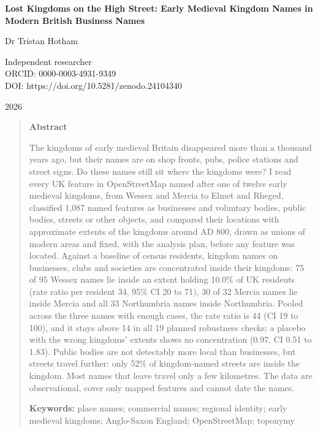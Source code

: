\documentclass[11pt,a4paper]{article}
\begin{document}
\begin{center}
{\Large\bfseries Lost Kingdoms on the High Street: Early Medieval Kingdom Names in Modern British Business Names\par}
\vspace{1.2em}
{\large Dr Tristan Hotham\par}
\vspace{0.3em}
{\small Independent researcher\\
ORCID: 0000-0003-4931-9349\\
DOI: https://doi.org/10.5281/zenodo.24104340\par}
\vspace{0.8em}
2026
\end{center}

\begin{quote}
\small
\begin{center}\textbf{Abstract}\end{center}
The kingdoms of early medieval Britain disappeared more than a thousand years ago, but their names are on shop fronts, pubs, police stations and street signs. Do these names still sit where the kingdoms were? I read every UK feature in OpenStreetMap named after one of twelve early medieval kingdoms, from Wessex and Mercia to Elmet and Rheged, classified 1,087 named features as businesses and voluntary bodies, public bodies, streets or other objects, and compared their locations with approximate extents of the kingdoms around AD 800, drawn as unions of modern areas and fixed, with the analysis plan, before any feature was located. Against a baseline of census residents, kingdom names on businesses, clubs and societies are concentrated inside their kingdoms: 75 of 95 Wessex names lie inside an extent holding 10.0\% of UK residents (rate ratio per resident 34, 95\% CI 20 to 71), 30 of 32 Mercia names lie inside Mercia and all 33 Northumbria names inside Northumbria. Pooled across the three names with enough cases, the rate ratio is 44 (CI 19 to 100), and it stays above 14 in all 19 planned robustness checks; a placebo with the wrong kingdoms' extents shows no concentration (0.97, CI 0.51 to 1.83). Public bodies are not detectably more local than businesses, but streets travel further: only 52\% of kingdom-named streets are inside the kingdom. Most names that leave travel only a few kilometres. The data are observational, cover only mapped features and cannot date the names.

\textbf{Keywords:} place names; commercial names; regional identity; early medieval kingdoms; Anglo-Saxon England; OpenStreetMap; toponymy
\end{quote}
\end{document}
